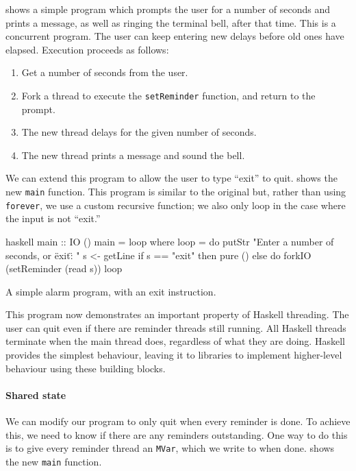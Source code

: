  shows a simple program which prompts the user for a
number of seconds and prints a message, as well as ringing the
terminal bell, after that time.  This is a concurrent program.  The
user can keep entering new delays before old ones have elapsed.
Execution proceeds as follows:

\begin{enumerate}
\item Get a number of seconds from the user.
\item Fork a thread to execute the \verb|setReminder| function, and
  return to the prompt.
\item The new thread delays for the given number of seconds.
\item The new thread prints a message and sound the bell.
\end{enumerate}

We can extend this program to allow the user to type ``exit'' to quit.
 shows the new \verb|main| function.  This program is
similar to the original but, rather than using \verb|forever|, we use
a custom recursive function; we also only loop in the case where the
input is not ``exit.''

\begin{listing}
\centering
\begin{cminted}{haskell}
main :: IO ()
main = loop where
  loop = do
    putStr "Enter a number of seconds, or \"exit\": "
    s <- getLine
    if s == "exit"
      then pure ()
      else do
        forkIO (setReminder (read s))
        loop
\end{cminted}
\caption{A simple alarm program, with an exit instruction.}\label{lst:ch_ex2}
\end{listing}

This program now demonstrates an important property of Haskell
threading.  The user can quit even if there are reminder threads still
running.  All Haskell threads terminate when the main thread does,
regardless of what they are doing.  Haskell provides the simplest
behaviour, leaving it to libraries to implement higher-level behaviour
using these building blocks.

\paragraph{Shared state}
We can modify our program to only quit when every reminder is done.
To achieve this, we need to know if there are any reminders
outstanding.  One way to do this is to give every reminder thread an
\verb|MVar|, which we write to when done.   shows the
new \verb|main| function.

